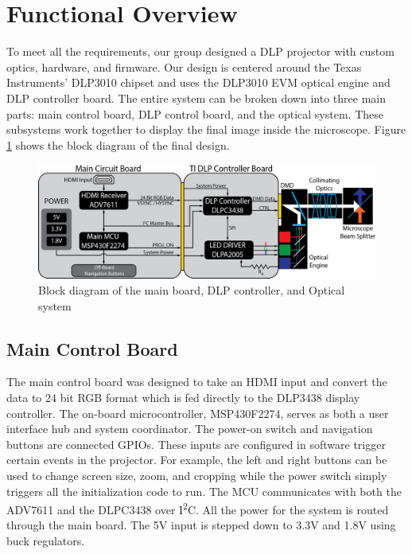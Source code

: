 \documentclass[12pt,a4paper]{article}
\begin{document}
\section{Functional Overview}
To meet all the requirements, our group designed a DLP projector with custom optics, hardware, and firmware. Our design is centered around the Texas Instruments’ DLP3010 chipset and uses the DLP3010 EVM optical engine and DLP controller board.  The entire system can be broken down into three main parts: main control board, DLP control board, and the optical system. These subsystems work together to display the final image inside the microscope. Figure \ref{block_diagram} shows the block diagram of the final design.

\begin{figure}[h!]
	\centering
	\includegraphics[width = \textwidth]{pics/seniorDesign_blockDiagram.png}
	\caption[Block Diagram]{Block diagram of the main board, DLP controller, and Optical system}
	\label{block_diagram}
\end{figure}


\subsection{Main Control Board}
The main control board was designed to take an HDMI input and convert the data to 24 bit RGB format which is fed directly to the DLP3438 display controller. The on-board microcontroller, MSP430F2274, serves as both a user interface hub and system coordinator. The power-on switch and navigation buttons are connected GPIOs. These inputs are configured in software trigger certain events in the projector. For example, the left and right buttons can be used to change screen size, zoom, and cropping while the power switch simply triggers all the initialization code to run. The MCU communicates with both the ADV7611 and the DLPC3438 over I\textsuperscript{2}C. All the power for the system is routed through the main board. The 5V input is stepped down to 3.3V and 1.8V using buck regulators. 
\end{document}
